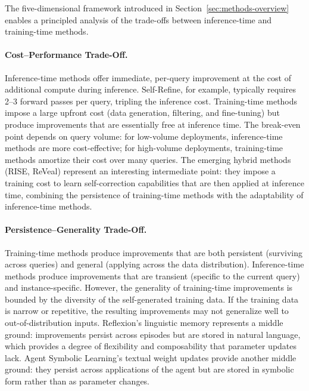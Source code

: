 The five-dimensional framework introduced in Section~\ref{sec:methods-overview} enables a principled analysis of the trade-offs between inference-time and training-time methods.

\paragraph{Cost--Performance Trade-Off.}
Inference-time methods offer immediate, per-query improvement at the cost of additional compute during inference. Self-Refine, for example, typically requires 2--3 forward passes per query, tripling the inference cost. Training-time methods impose a large upfront cost (data generation, filtering, and fine-tuning) but produce improvements that are essentially free at inference time. The break-even point depends on query volume: for low-volume deployments, inference-time methods are more cost-effective; for high-volume deployments, training-time methods amortize their cost over many queries. The emerging hybrid methods (RISE, ReVeal) represent an interesting intermediate point: they impose a training cost to learn self-correction capabilities that are then applied at inference time, combining the persistence of training-time methods with the adaptability of inference-time methods.

\paragraph{Persistence--Generality Trade-Off.}
Training-time methods produce improvements that are both persistent (surviving across queries) and general (applying across the data distribution). Inference-time methods produce improvements that are transient (specific to the current query) and instance-specific. However, the generality of training-time improvements is bounded by the diversity of the self-generated training data. If the training data is narrow or repetitive, the resulting improvements may not generalize well to out-of-distribution inputs. Reflexion's linguistic memory represents a middle ground: improvements persist across episodes but are stored in natural language, which provides a degree of flexibility and composability that parameter updates lack. Agent Symbolic Learning's textual weight updates provide another middle ground: they persist across applications of the agent but are stored in symbolic form rather than as parameter changes.


